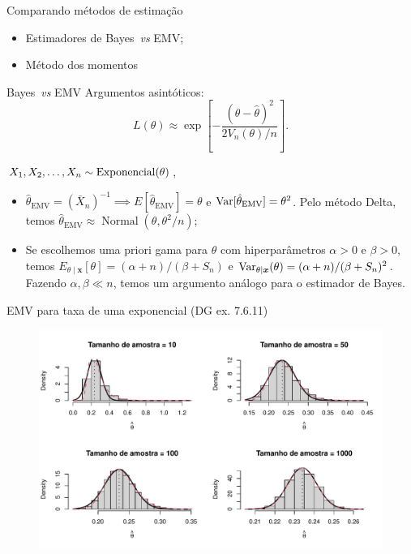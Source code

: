 \begin{frame}{Comparando métodos de estimação}
 \begin{itemize}
  \item Estimadores de Bayes~\textit{vs} EMV;
  \item Método dos momentos
 \end{itemize}
\end{frame}

\begin{frame}{Bayes~\textit{vs} EMV}
Argumentos asintóticos:
  \begin{equation*}
   L(\theta) \approx \exp\left[-\frac{\left(\theta-\hat{\theta}\right)^2}{2V_n(\theta)/n} \right].
  \end{equation*}
 \begin{exemplo}
    $X_1, X_2, \ldots, X_n \sim \operatorname{Exponencial}(\theta)$, 
    \begin{itemize}
     \item   $\hat{\theta}_{\text{EMV}} = \left(\bar{X}_n\right)^{-1} \implies E[\hat{\theta}_{\text{EMV}}] = \theta$ e $\operatorname{Var}[\hat{\theta}_{\text{EMV}}] = \theta^2$.
  Pelo método Delta, temos $\hat{\theta}_{\text{EMV}} \approx \operatorname{Normal}(\theta, \theta^2/n)$;
    \item Se escolhemos uma priori gama para $\theta$ com hiperparâmetros $\alpha > 0$ e $\beta > 0$,    temos $E_{\theta \mid \boldsymbol{x}}[\theta] = (\alpha + n)/(\beta + S_n)$ e $\operatorname{Var}_{\theta \mid \boldsymbol{x}}(\theta) = (\alpha + n)/ (\beta + S_n)^2$.
    Fazendo $\alpha, \beta \ll n$, temos um argumento análogo para o estimador de Bayes.
    \end{itemize}  
 \end{exemplo}
\end{frame}


\begin{frame}{EMV para taxa de uma exponencial (DG ex. 7.6.11)}
\begin{figure}[!ht]
\label{fig:mle_exponential_deltaMethod}
\begin{center}
\includegraphics[scale=0.6]{figures/exponential_mle_deltaMethod.pdf} 
\end{center} 
\end{figure} 
\end{frame}

